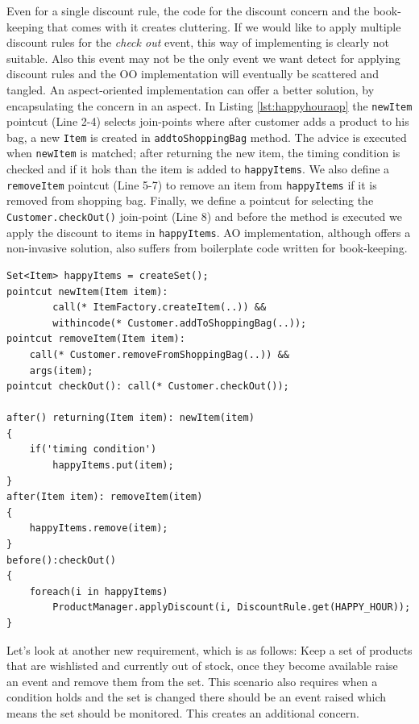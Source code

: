 \documentclass{llncs}
\begin{document}
Even for a single discount rule, the code for the discount concern and the book-keeping that comes with it creates cluttering. If we would like to apply multiple discount rules for the \emph{check out} event, this way of implementing is clearly not suitable. Also this event may not be the only event we want detect for applying discount rules and the OO implementation will eventually be scattered and tangled. An aspect-oriented implementation can offer a better solution, by encapsulating the concern in an aspect. In Listing \ref{lst:happyhouraop} the \texttt{newItem} pointcut (Line 2-4) selects join-points where after customer adds a product to his bag, a new \texttt{Item} is created in \texttt{addtoShoppingBag} method. The advice is executed when \texttt{newItem} is matched; after returning the new item, the timing condition is checked and if it hols than the item is added to \texttt{happyItems}. We also define a \texttt{removeItem} pointcut (Line 5-7)  to remove an item from \texttt{happyItems} if it is removed from shopping bag. Finally, we define a pointcut for selecting the \texttt{Customer.checkOut()} join-point (Line 8) and before the method is executed we apply the discount to items in \texttt{happyItems}. AO implementation, although offers a non-invasive solution, also suffers from boilerplate code written for book-keeping. 

\begin{lstlisting}[float, caption={An Aspectj implementation of Happy-hour discount rule}, label={lst:happyhouraop}]
Set<Item> happyItems = createSet();
pointcut newItem(Item item): 
		call(* ItemFactory.createItem(..)) && 
		withincode(* Customer.addToShoppingBag(..));
pointcut removeItem(Item item): 
	call(* Customer.removeFromShoppingBag(..)) && 
	args(item);
pointcut checkOut(): call(* Customer.checkOut());

after() returning(Item item): newItem(item)
{
	if('timing condition')
		happyItems.put(item);
}
after(Item item): removeItem(item)
{
	happyItems.remove(item);
}
before():checkOut()
{
	foreach(i in happyItems)
		ProductManager.applyDiscount(i, DiscountRule.get(HAPPY_HOUR));
}
\end{lstlisting}

Let's look at another new requirement, which is as follows: \textsf{Keep a set of products that are wishlisted and currently out of stock,  once they become available raise an event and remove them from the set}. This scenario also requires when a condition holds and the set is changed there should be an event raised which means the set should be monitored. This creates an additional concern. 
\end{document}

